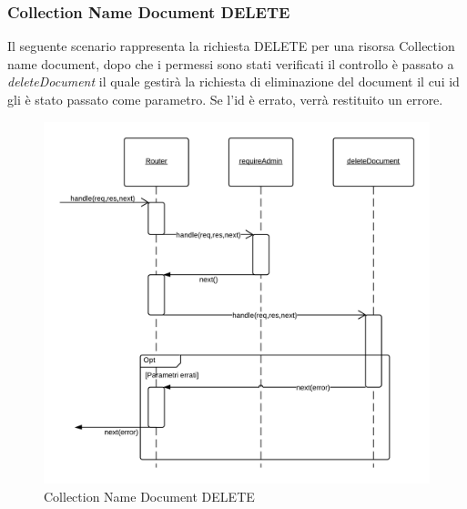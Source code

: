 \subsubsection{Collection Name Document DELETE}
Il seguente scenario rappresenta la richiesta DELETE per una risorsa Collection name document, dopo che i permessi sono stati verificati il controllo è passato a \emph{deleteDocument} il quale gestirà la richiesta di eliminazione del document il cui id gli è stato passato come parametro. Se l'id è errato, verrà restituito un errore.
\begin{figure}[H]
	\begin{center} 
		\includegraphics[scale=0.20]{scenari/Collection Name Document DELETE.png} 
		\caption{Collection Name Document DELETE}
	\end{center} 
\end{figure}

